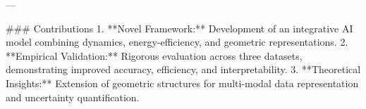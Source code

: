 ---

### Contributions  
1. **Novel Framework:** Development of an integrative AI model combining dynamics, energy-efficiency, and geometric representations.  
2. **Empirical Validation:** Rigorous evaluation across three datasets, demonstrating improved accuracy, efficiency, and interpretability.  
3. **Theoretical Insights:** Extension of geometric structures for multi-modal data representation and uncertainty quantification.